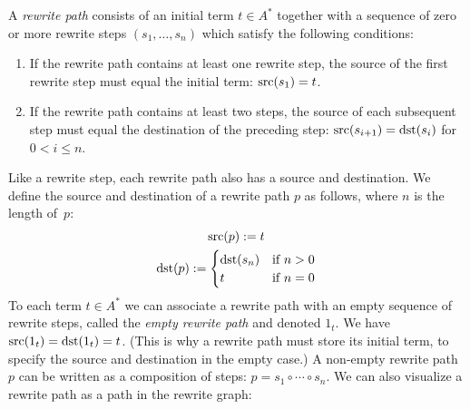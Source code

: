 \documentclass[../generics]{subfiles}
\begin{document}
\begin{definition}
A \emph{rewrite path} consists of an initial term $t\in A^*$ together with a sequence of zero or more rewrite steps $(s_1,\ldots,s_n)$ which satisfy the following conditions:
\begin{enumerate}
\item If the rewrite path contains at least one rewrite step, the source of the first rewrite step must equal the initial term: $\operatorname{src}(s_1)=t$.
\item If the rewrite path contains at least two steps, the source of each subsequent step must equal the destination of the preceding step: $\operatorname{src}(s_{i+1})=\operatorname{dst}(s_i)$ for $0<i\leq n$.
\end{enumerate}
Like a rewrite step, each rewrite path also has a source and destination. We define the source and destination of a rewrite path $p$ as follows, where $n$ is the length of~$p$:
\begin{gather*}
\operatorname{src}(p):=t\\
\operatorname{dst}(p):=\begin{cases}
\operatorname{dst}(s_n)&\text{if $n>0$}\\
t&\text{if $n=0$}
\end{cases}
\end{gather*}
To each term $t\in A^*$ we can associate a rewrite path with an empty sequence of rewrite steps, called the \emph{empty rewrite path} and denoted $1_t$. We have $\operatorname{src}(1_t)=\operatorname{dst}(1_t)=t$. (This is why a rewrite path must store its initial term, to specify the source and destination in the empty case.) A non-empty rewrite path $p$ can be written as a composition of steps: $p=s_1\circ\cdots\circ s_n$. We can also visualize a rewrite path as a path in the rewrite graph:

\begin{center}
\end{center}
\end{definition}

\newcommand{\BRule}{(ab\Rightarrow\varepsilon)}
\newcommand{\BRuleInv}{(\varepsilon\Rightarrow ab)}
\end{document}
